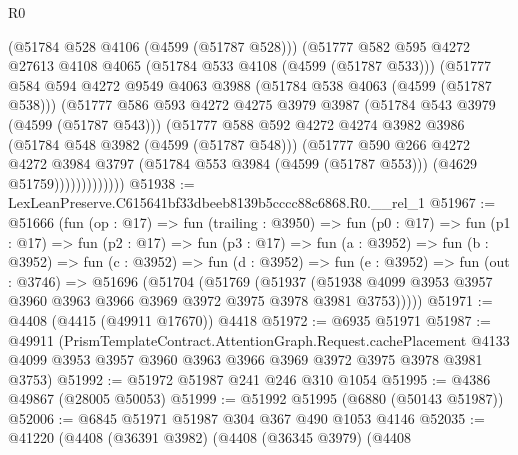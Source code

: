 \begin{lexlean}{R0}
\begin{coremodule}
                  (@51784 @528 @4106 (@4599 (@51787 @528)))
                  (@51777
                    @582
                    @595
                    @4272
                    @27613
                    @4108
                    @4065
                    (@51784 @533 @4108 (@4599 (@51787 @533)))
                    (@51777
                      @584
                      @594
                      @4272
                      @9549
                      @4063
                      @3988
                      (@51784 @538 @4063 (@4599 (@51787 @538)))
                      (@51777
                        @586
                        @593
                        @4272
                        @4275
                        @3979
                        @3987
                        (@51784 @543 @3979 (@4599 (@51787 @543)))
                        (@51777
                          @588
                          @592
                          @4272
                          @4274
                          @3982
                          @3986
                          (@51784 @548 @3982 (@4599 (@51787 @548)))
                          (@51777
                            @590
                            @266
                            @4272
                            @4272
                            @3984
                            @3797
                            (@51784 @553 @3984 (@4599 (@51787 @553)))
                            (@4629 @51759)))))))))))))
@51938 := LexLeanPreserve.C615641bf33dbeeb8139b5cccc88c6868.R0.__rel_1
@51967 := @51666
    (fun (op : @17) =>
    fun (trailing : @3950) =>
    fun (p0 : @17) =>
    fun (p1 : @17) =>
    fun (p2 : @17) =>
    fun (p3 : @17) =>
    fun (a : @3952) =>
    fun (b : @3952) =>
    fun (c : @3952) =>
    fun (d : @3952) =>
    fun (e : @3952) =>
    fun (out : @3746) =>
    @51696
      (@51704
        (@51769
          (@51937
            (@51938 @4099 @3953 @3957 @3960 @3963 @3966 @3969 @3972 @3975 @3978 @3981 @3753)))))
@51971 := @4408 (@4415 (@49911 @17670)) @4418
@51972 := @6935 @51971
@51987 := @49911
    (PrismTemplateContract.AttentionGraph.Request.cachePlacement
      @4133
      @4099
      @3953
      @3957
      @3960
      @3963
      @3966
      @3969
      @3972
      @3975
      @3978
      @3981
      @3753)
@51992 := @51972 @51987 @241 @246 @310 @1054
@51995 := @4386 @49867 (@28005 @50053)
@51999 := @51992 @51995 (@6880 (@50143 @51987))
@52006 := @6845 @51971 @51987 @304 @367 @490 @1053 @4146
@52035 := @41220
    (@4408
      (@36391 @3982)
      (@4408
        (@36345 @3979)
        (@4408

\end{coremodule}
\end{lexlean}
